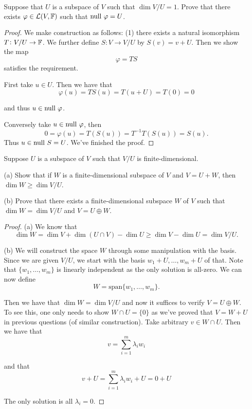 \documentclass{extarticle}
\begin{document}
\begin{problem}{17}
    Suppose that \(U\) is a subspace of \(V\) such that \(\dim V / U = 1\). Prove that there exists 
    \(\varphi \in \mathcal{L}(V, \mathbb{F})\) such that \(\text{null } \varphi = U\).
\end{problem}

\begin{proof}
We make construction as follows: (1) there exists a natural isomorphism \(T \colon V / U \to 
\mathbb{F}\). We further define \(S \colon V \to V / U\) by \(S(v) = v + U\). Then we show the map 
\[\varphi = TS\]
satisfies the requirement. 

First take \(u \in U\). Then we have that 
\[\varphi(u) = TS(u) = T(u + U) = T(0) = 0\]

and thus \(u \in \text{null } \varphi\). 

Conversely take \(u \in \text{null } \varphi\), then 
\[0 = \varphi(u) = T(S(u)) = T^{-1} T(S(u)) = S(u).\]
Thus \(u \in \text{null } S = U\). We've finished the proof. 
\end{proof}

\begin{problem}{18}
    Suppose \(U\) is a subspace of \(V\) such that \(V / U\) is finite-dimensional. 

    (a) Show that if \(W\) is a finite-dimensional subspace of \(V\) and \(V = U + W\), 
    then \(\dim W \geq \dim V / U\). 

    (b) Prove that there exists a finite-dimensional subspace \(W\) of \(V\) such that 
    \(\dim W = \dim V / U\) and \(V = U \oplus W\).
\end{problem}

\begin{proof}
(a) We know that 
\[\dim W = \dim V + \dim (U \cap V) - \dim U \geq \dim V - \dim U = \dim V / U.\]

(b) We will construct the space \(W\) through some manipulation with the basis. Since we 
are given \(V/ U\), we start with the basis \(w_1 + U, \ldots, w_m + U\) of that. Note that 
\(\{w_1, \ldots, w_m\}\) is linearly independent as the only solution is all-zero. We can now 
define 
\[W = \text{span}\{w_1, \ldots, w_m\}.\]

Then we have that \(\dim W = \dim V / U\) and now it suffices to verify \(V = U \oplus W\). To 
see this, one only needs to show \(W \cap U = \{0\}\) as we've proved that \(V = W + U\) in 
previous questions (of similar construction). Take arbitrary \(v \in W \cap U\). Then we have that 
\[v = \sum_{i=1}^{m} \lambda_i w_i \]

and that 
\[v + U = \sum_{i=1}^{m} \lambda_i w_i + U = 0 + U\]

The only solution is all \(\lambda_i = 0\). 
\end{proof}
\end{document}

